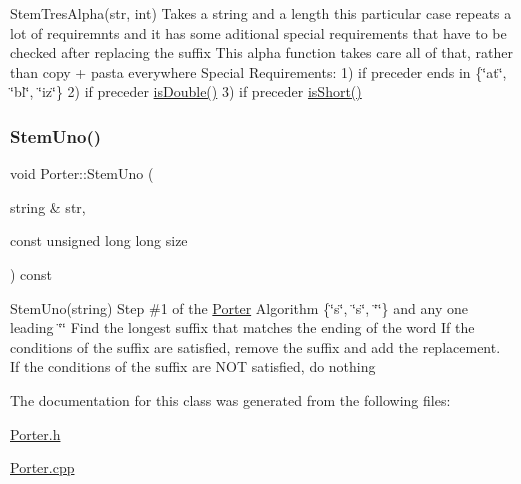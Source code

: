 Stem\+Tres\+Alpha(str, int) Takes a string and a length this particular case repeats a lot of requiremnts and it has some aditional special requirements that have to be checked after replacing the suffix This alpha function takes care all of that, rather than copy + pasta everywhere Special Requirements\+: 1) if preceder ends in \{\char`\"{}at\char`\"{}, \char`\"{}bl\char`\"{}, \char`\"{}iz\char`\"{}\} 2) if preceder \hyperlink{classPorter_a7c8a4b3b6103ce655e8ffc8a3eba1897}{is\+Double()} 3) if preceder \hyperlink{classPorter_a35b1cc5606d4e78d1f69ac4037fdde87}{is\+Short()} \mbox{\label{classPorter_ad8b63c9741655393ff9c849d269c953a}} 
\subsubsection{\texorpdfstring{Stem\+Uno()}{StemUno()}}
{\footnotesize\ttfamily void Porter\+::\+Stem\+Uno (\begin{DoxyParamCaption}\item[{string \&}]{str,  }\item[{const unsigned long long}]{size }\end{DoxyParamCaption}) const}

Stem\+Uno(string) Step \#1 of the \hyperlink{classPorter}{Porter} Algorithm \{\char`\"{}\textquotesingle{}s\textquotesingle{}\char`\"{}, \char`\"{}\textquotesingle{}s\char`\"{}, \char`\"{}\textquotesingle{}\char`\"{}\} and any one leading \char`\"{}\textquotesingle{}\char`\"{} Find the longest suffix that matches the ending of the word If the conditions of the suffix are satisfied, remove the suffix and add the replacement. If the conditions of the suffix are N\+OT satisfied, do nothing 

The documentation for this class was generated from the following files\+:\begin{DoxyCompactItemize}
\item 
\hyperlink{Porter_8h}{Porter.\+h}\item 
\hyperlink{Porter_8cpp}{Porter.\+cpp}\end{DoxyCompactItemize}
